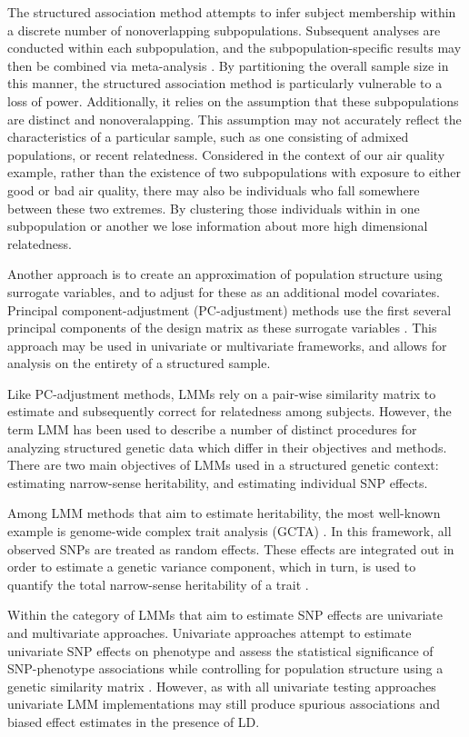 The structured association method attempts to infer subject membership within a discrete number of nonoverlapping subpopulations. Subsequent analyses are conducted within each subpopulation, and the subpopulation-specific results may then be combined via meta-analysis \cite{pritchard1999use, pritchard2000association}. By partitioning the overall sample size in this manner, the structured association method is particularly vulnerable to a loss of power. Additionally, it relies on the assumption that these subpopulations are distinct and nonoveralapping. This assumption may not accurately reflect the characteristics of a particular sample, such as one consisting of admixed populations, or recent relatedness. Considered in the context of our air quality example, rather than the existence of two subpopulations with exposure to either good or bad air quality, there may also be individuals who fall somewhere between these two extremes. By clustering those individuals within in one subpopulation or another we lose information about more high dimensional relatedness.

Another approach is to create an approximation of population structure using surrogate variables, and to adjust for these as an additional model covariates. Principal component-adjustment (PC-adjustment) methods use the first several principal components of the design matrix as these surrogate variables \cite{price2006principal}. This approach may be used in univariate or multivariate frameworks, and allows for analysis on the entirety of a structured sample. 

Like PC-adjustment methods, LMMs rely on a pair-wise similarity matrix to estimate and subsequently correct for relatedness among subjects. However, the term LMM has been used to describe a number of distinct procedures for analyzing structured genetic data which differ in their objectives and methods. There are two main objectives of LMMs used in a structured genetic context: estimating narrow-sense heritability, and estimating individual SNP effects.

Among LMM methods that aim to estimate heritability, the most well-known example is genome-wide complex trait analysis (GCTA) \cite{yang2011gcta}. In this framework, all observed SNPs are treated as random effects. These effects are integrated out in order to estimate a genetic variance component, which in turn, is used to quantify the total narrow-sense heritability of a trait \cite{yang2010common}. 

Within the category of LMMs that aim to estimate SNP effects are univariate and multivariate approaches. Univariate approaches attempt to estimate univariate SNP effects on phenotype and assess the statistical significance of SNP-phenotype associations while controlling for population structure using a genetic similarity matrix \cite{yu2006unified, kang2010variance, kang2008efficient}. However, as with all univariate testing approaches univariate LMM implementations may still produce spurious associations and biased effect estimates in the presence of LD. 

